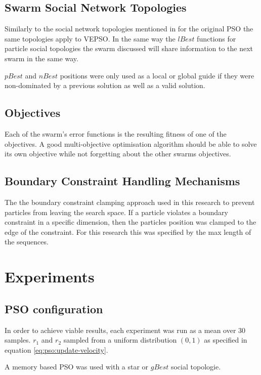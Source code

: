 \documentclass[conference]{IEEEtran}
\begin{document}
\subsection{Swarm Social Network Topologies}

Similarly to the social network topologies mentioned in for the original \ac{PSO} the same topologies apply to \ac{VEPSO}. In the same way the $lBest$ functions for particle social topologies the swarm discussed will share information to the next swarm in the same way.

$pBest$ and $nBest$ positions were only used as a local or global guide if they were non-dominated by a previous solution as well as a valid solution.

\subsection{Objectives}

Each of the swarm's error functions is the resulting fitness of one of the objectives. A good multi-objective optimisation algorithm should be able to solve its own objective while not forgetting about the other swarms objectives.

\subsection{Boundary Constraint Handling Mechanisms}

The the boundary constraint clamping approach used in this research to prevent particles from leaving the search space. If a particle violates a boundary constraint in a specific dimension, then the particles position was clamped to the edge of the constraint. For this research this was specified by the max length of the sequences.

\section{Experiments}
    \subsection{\ac{PSO} configuration}
    In order to achieve viable results, each experiment was run as a mean over 30 samples. $r_1$ and $r_2$ sampled from a uniform distribution $ (0, 1) $ as specified in equation \ref{eq:pso:update-velocity}.
    
    A memory based \ac{PSO} was used with a star or $ gBest $ social topologie. 
    
\end{document}
